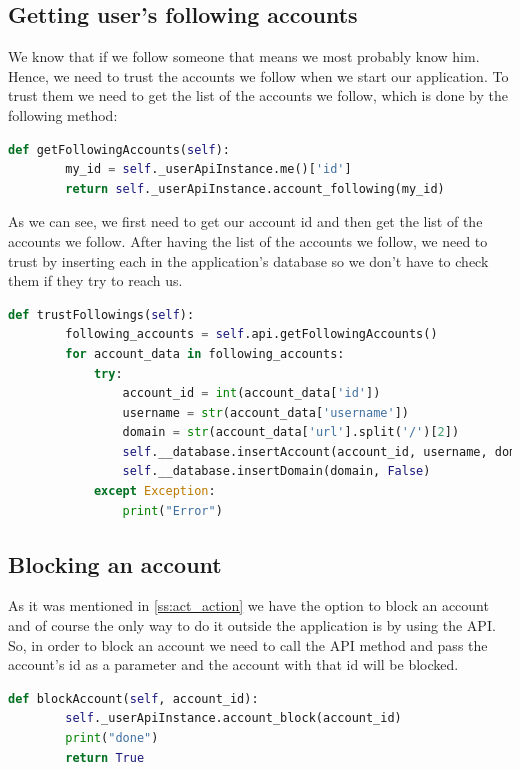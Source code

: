 \subsection{Getting user's following accounts}
We know that if we follow someone that means we most probably know him. Hence, we need to trust the accounts we follow when we start our application. To trust them we need to get the list of the accounts we follow, which is done by the following method:
\\[5pt]
\begin{lstlisting}[language=python, caption={Method to get the list of the accounts we follow}, captionpos=b]
	def getFollowingAccounts(self):
		my_id = self._userApiInstance.me()['id']
		return self._userApiInstance.account_following(my_id)
\end{lstlisting}
As we can see, we first need to get our account id and then get the list of the accounts we follow. After having the list of the accounts we follow, we need to trust by inserting each in the application's database so we don't have to check them if they try to reach us.
\\[5pt]
\begin{lstlisting}[language=python, caption={Inserting the accounts we follow immediately in the application database}, captionpos=b]
	def trustFollowings(self):
		following_accounts = self.api.getFollowingAccounts()   
		for account_data in following_accounts:
			try:
				account_id = int(account_data['id'])
				username = str(account_data['username'])
				domain = str(account_data['url'].split('/')[2])
				self.__database.insertAccount(account_id, username, domain, False)
				self.__database.insertDomain(domain, False)
			except Exception:
				print("Error")
\end{lstlisting}
\subsection{Blocking an account}
As it was mentioned in \ref{ss:act_action} we have the option to block an account and of course the only way to do it outside the application is by using the API. So, in order to block an account we need to call the API method and pass the account's id as a parameter
and the account with that id will be blocked.
\\[5pt]
\begin{lstlisting}[language=python, caption={Blocking an account method}, captionpos=b]
	def blockAccount(self, account_id):
		self._userApiInstance.account_block(account_id)
		print("done")
		return True
\end{lstlisting}
